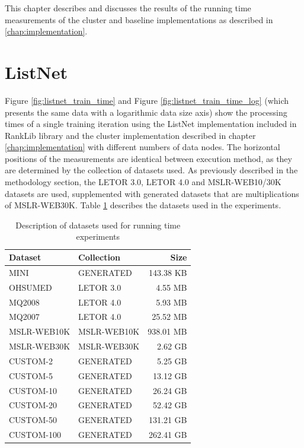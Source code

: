 This chapter describes and discusses the results of the running time measurements of the cluster and baseline implementations as described in \ref{chap:implementation}.
\section{ListNet}
Figure \ref{fig:listnet_train_time} and Figure \ref{fig:listnet_train_time_log} (which presents the same data with a logarithmic data size axis) show the processing times of a single training iteration using the ListNet implementation included in RankLib library and the cluster implementation described in chapter \ref{chap:implementation} with different numbers of data nodes. The horizontal positions of the measurements are identical between execution method, as they are determined by the collection of datasets used. As previously described in the methodology section, the LETOR 3.0, LETOR 4.0 and MSLR-WEB10/30K datasets are used, supplemented with generated datasets that are multiplications of MSLR-WEB30K. Table \ref{tbl:recap_datasets} describes the datasets used in the experiments.

\begin{table}[!h]
\centering
\begin{tabular}{p{3.4cm}p{3.4cm}r}\toprule
Dataset & Collection & Size \\
\midrule
MINI		& GENERATED		  & 143.38 KB\\
OHSUMED     & LETOR 3.0       &   4.55 MB\\
MQ2008      & LETOR 4.0       &   5.93 MB\\
MQ2007      & LETOR 4.0       &  25.52 MB\\
MSLR-WEB10K & MSLR-WEB10K     & 938.01 MB\\
MSLR-WEB30K & MSLR-WEB30K     &   2.62 GB\\
CUSTOM-2	& GENERATED		  &   5.25 GB\\
CUSTOM-5	& GENERATED		  &  13.12 GB\\
CUSTOM-10	& GENERATED		  &  26.24 GB\\
CUSTOM-20   & GENERATED       &  52.42 GB\\
CUSTOM-50	& GENERATED		  & 131.21 GB\\
CUSTOM-100	& GENERATED		  & 262.41 GB\\
\bottomrule
\end{tabular}
\caption{Description of datasets used for running time experiments}
\label{tbl:recap_datasets}
\end{table}

